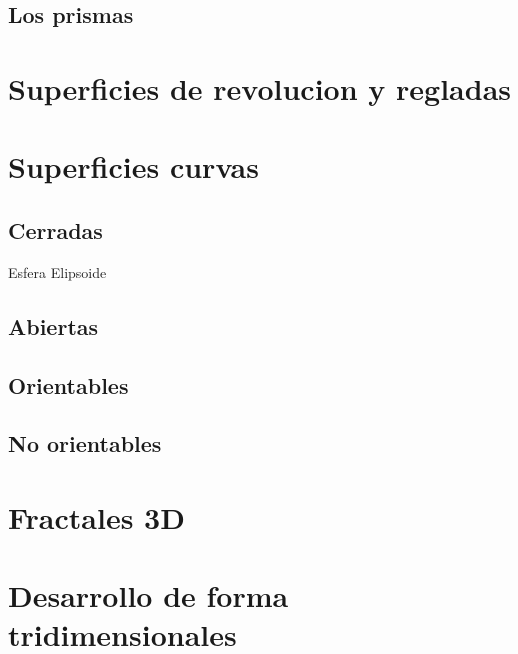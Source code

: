 \documentclass[
  16pt,
]{krantz}
\theoremstyle{definition}
\theoremstyle{definition}
\theoremstyle{definition}
\theoremstyle{definition}
\theoremstyle{remark}
\begin{document}
\hypertarget{los-prismas}{%
\subsection{Los prismas}\label{los-prismas}}

\hypertarget{superficies-de-revolucion-y-regladas}{%
\section{Superficies de revolucion y regladas}\label{superficies-de-revolucion-y-regladas}}

\hypertarget{superficies-curvas}{%
\section{Superficies curvas}\label{superficies-curvas}}

\hypertarget{cerradas}{%
\subsection{Cerradas}\label{cerradas}}

Esfera Elipsoide

\hypertarget{abiertas}{%
\subsection{Abiertas}\label{abiertas}}

\hypertarget{orientables}{%
\subsection{Orientables}\label{orientables}}

\hypertarget{no-orientables}{%
\subsection{No orientables}\label{no-orientables}}

\hypertarget{fractales-3d}{%
\section{Fractales 3D}\label{fractales-3d}}

\hypertarget{desarrollo-de-forma-tridimensionales}{%
\section{Desarrollo de forma tridimensionales}\label{desarrollo-de-forma-tridimensionales}}
\end{document}
